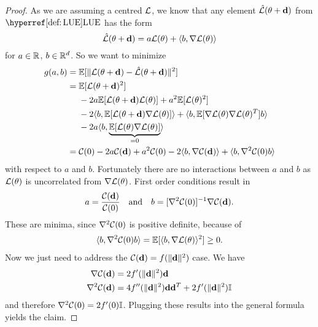 \begin{proof}
	As we are assuming a centred \(\mathcal{L}\), we know that any  element
	\(\hat{\mathcal{L}}(\theta + \mathbf{d})\) from \(\LUE\) has the form
	\begin{equation*}
		\hat{\mathcal{L}}(\theta + \mathbf{d})
		= a\mathcal{L}(\theta) + \langle b, \nabla\mathcal{L}(\theta)\rangle
	\end{equation*}
	for \(a\in\mathbb{R}\), \(b\in \mathbb{R}^d\). So we want to minimize 
	\begin{align*}
		g(a,b)
		&=\mathbb{E}[\|\mathcal{L}(\theta +\mathbf{d}) - \hat{\mathcal{L}}(\theta + \mathbf{d})\|^2]\\
		&= \begin{aligned}[t]
			&\mathbb{E}[\mathcal{L}(\theta +\mathbf{d})^2]\\
			&- 2a\mathbb{E}[\mathcal{L}(\theta + \mathbf{d})\mathcal{L}(\theta)] + a^2 \mathbb{E}[\mathcal{L}(\theta)^2]\\
			&- 2\langle b, \mathbb{E}[\mathcal{L}(\theta + \mathbf{d})\nabla\mathcal{L}(\theta)]\rangle
			+ \langle b, \mathbb{E}[\nabla\mathcal{L}(\theta)\nabla\mathcal{L}(\theta)^T] b\rangle\\
			&- 2a\langle b, \underbrace{\mathbb{E}[\mathcal{L}(\theta)\nabla\mathcal{L}(\theta)]}_{=0}\rangle
		\end{aligned}\\
		&=\mathcal{C}(0) - 2a\mathcal{C}(\mathbf{d}) + a^2 \mathcal{C}(0)
		- 2\langle b, \nabla\mathcal{C}(\mathbf{d})\rangle
		+ \langle b, \nabla^2\mathcal{C}(0) b\rangle
	\end{align*}
	with respect to \(a\) and \(b\). Fortunately there are no interactions
	between \(a\) and \(b\) as \(\mathcal{L}(\theta)\) is uncorrelated from
	\(\nabla\mathcal{L}(\theta)\). First order conditions result in
	\begin{equation*}
		a= \frac{\mathcal{C}(\mathbf{d})}{\mathcal{C}(0)}
		\quad \text{and} \quad
		b = [\nabla^2 \mathcal{C}(0)]^{-1}\nabla \mathcal{C}(\mathbf{d}).
	\end{equation*}
	These are minima, since \(\nabla^2\mathcal{C}(0)\) is positive definite, because of
	\begin{align*}
		\langle b, \nabla^2\mathcal{C}(0) b\rangle = \mathbb{E}[\langle b, \nabla\mathcal{L}(\theta)\rangle^2] \ge 0.
	\end{align*}
	Now we just need to address the \(\mathcal{C}(\mathbf{d}) = f(\|\mathbf{d}\|^2)\) case. We have
	\begin{align*}
		\nabla \mathcal{C}(\mathbf{d}) &= 2f'(\|\mathbf{d}\|^2) \mathbf{d}\\
		\nabla^2 \mathcal{C}(\mathbf{d}) &= 4 f''(\|\mathbf{d}\|^2) \mathbf{d} \mathbf{d}^T + 2f'(\|\mathbf{d}\|^2)\mathbb{I}
	\end{align*}
	and therefore \(\nabla^2\mathcal{C}(0) = 2f'(0)\mathbb{I}\). Plugging these results
	into the general formula yields the claim.
\end{proof}

